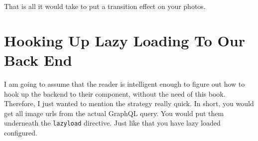 That is all it would take to put a transition effect on your photos.

\section{ Hooking Up Lazy Loading To Our Back End }
I am going to assume that the reader is intelligent enough to figure out how to
hook up the backend to their component, without the need of this book. Therefore, 
I just wanted to mention the strategy really quick. In short, you would get all 
image urls from the actual GraphQL query. You would put them underneath the 
\lstinline{lazyload} directive. Just like that you have lazy loaded configured. 

